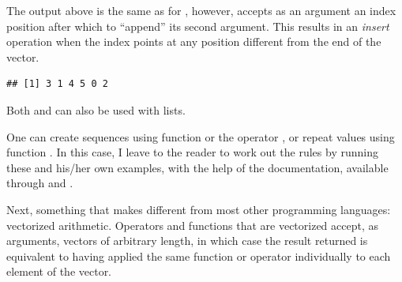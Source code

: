 \documentclass[krantz2]{krantz}\usepackage{knitr}
\begin{document}
The output above is the same as for , however,  accepts as an argument an index position after which to ``append'' its second argument. This results in an \emph{insert} operation when the index points at any position different from the end of the vector.

\begin{knitrout}\footnotesize
{}\color{fgcolor}\begin{kframe}
\begin{alltt}
    \hlstd{=} \hlstd{)}
\end{alltt}
\begin{verbatim}
## [1] 3 1 4 5 0 2
\end{verbatim}
\end{kframe}
\end{knitrout}

Both  and  can also be used with lists.

\begin{playground}
One can create sequences using function  or the operator \Roperator{:}, or repeat values using function . In this case, I leave to the reader to work out the rules by running these and his/her own examples, with the help of the documentation, available through  and .

\begin{knitrout}\footnotesize
{}\color{fgcolor}\begin{kframe}
\begin{alltt}
 \hlkwb{<-} \hlopt{-}\hlopt{:}
 \hlkwb{<-} \hlopt{:-}
 \hlkwb{<-} \hlstd{(} \hlstd{=} \hlopt{-}\hlstd{,}  \hlstd{=} \hlstd{,}  \hlstd{=} \hlstd{)}
 \hlkwb{<-} \hlstd{(}\hlopt{-}\hlstd{,} \hlstd{)}
\end{alltt}
\end{kframe}
\end{knitrout}

\end{playground}

Next, something that makes \Rlang different from most other programming languages: vectorized arithmetic. Operators and functions that are vectorized accept, as arguments, vectors of arbitrary length, in which case the result returned is equivalent to having applied the same function or operator individually to each element of the vector.\label{par:vectorized:numeric}
\end{document}
